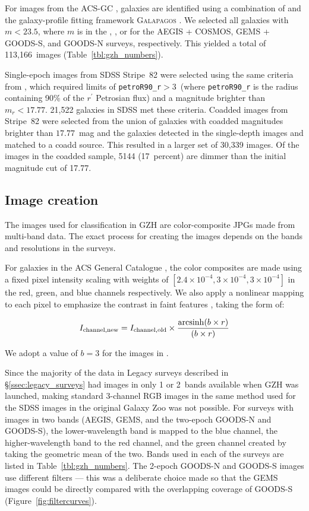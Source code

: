 \documentclass[twocolumn]{aastex6}
\begin{document}
For images from the ACS-GC \citet{gri12}, galaxies are identified using a combination of \sextractor{} \citep{ber96} and the galaxy-profile fitting framework \textsc{Galapagos} \citep{bar12}. We selected all galaxies with $m < 23.5$, where $m$ is in the \Iband, \zband, or \iband{} for the AEGIS + COSMOS, GEMS + GOODS-S, and GOODS-N surveys, respectively. This yielded a total of 113,166~images (Table~\ref{tbl:gzh_numbers}).

Single-epoch images from SDSS Stripe~82 were selected using the same criteria from \citet{wil13}, which required limits of \texttt{petroR90\_r}$ > 3$\arcsec~(where \texttt{petroR90\_r} is the radius containing 90\% of the $r^\prime$ Petrosian flux) and a magnitude brighter than $m_r < 17.77$. 21,522 galaxies in SDSS met these criteria. Coadded images from Stripe~82 were selected from the union of galaxies with coadded magnitudes brighter than $17.77$~mag and the galaxies detected in the single-depth images and matched to a coadd source. This resulted in a larger set of 30,339 images. Of the images in the coadded sample, 5144 (17~percent) are dimmer than the initial magnitude cut of 17.77. 

\subsection{Image creation}

The images used for classification in GZH are color-composite JPGs made from multi-band data. The exact process for creating the images depends on the bands and resolutions in the surveys. 

For galaxies in the ACS General Catalogue \citep[AEGIS, COSMOS, GEMS, 2-epoch GOODS;][]{gri12}, the color composites are made using a fixed pixel intensity scaling with weights of $[2.4\times10^{-4},3\times10^{-4},3\times10^{-4}]$ in the red, green, and blue channels respectively. We also apply a nonlinear mapping to each pixel to emphasize the contrast in faint features \citep{lup04}, taking the form of:

\begin{equation}
I_\mathrm{channel,new} = I_\mathrm{channel,old} \times \frac{\arcsinh(b\times r)}{(b\times r)}
\label{eqn:nonlinear}
\end{equation}

\noindent We adopt a value of $b=3$ for the \hst{} images in \citet{gri12}. 

Since the majority of the data in Legacy surveys described in \S\ref{ssec:legacy_surveys} had images in only 1 or 2~bands available when GZH was launched, making standard 3-channel RGB images in the same method used for the SDSS images in the original Galaxy Zoo was not possible. For surveys with images in two bands (AEGIS, GEMS, and the two-epoch GOODS-N and GOODS-S), the lower-wavelength band is mapped to the blue channel, the higher-wavelength band to the red channel, and the green channel created by taking the geometric mean of the two. Bands used in each of the surveys are listed in Table~\ref{tbl:gzh_numbers}. The 2-epoch GOODS-N and GOODS-S images use different filters --- this was a deliberate choice made so that the GEMS images could be directly compared with the overlapping coverage of GOODS-S (Figure~\ref{fig:filtercurves}). 
\end{document}
